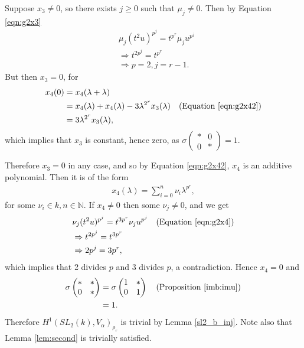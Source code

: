 	Suppose $x_3\neq 0$, so there exists $j\geq 0$ such that $\mu_j\neq 0$. Then by Equation \ref{eqn:g2x3}
	\begin{align*}
	&\mu_j (t^2u)^{p^j} = t^{p^r}\mu_j u^{p^j}\\
		&\Rightarrow t^{2p^j} = t^{p^r}\\
		&\Rightarrow p = 2, j = r-1.
		\end{align*}
		But then $x_3 = 0$, for
		\begin{align*}
		x_4(0) &= x_4(\lambda + \lambda) \\
							&= x_4(\lambda)+x_4(\lambda)-3\lambda^{2^r}x_3(\lambda)\quad(\textrm{Equation \ref{eqn:g2x42}}) \\
							&= 3\lambda^{2^r}x_3(\lambda),
		\end{align*}
		which implies that $x_3$ is constant, hence zero, as $\sigma\left(\begin{matrix}* & 0\\0 & *\end{matrix}\right) = 1$.

		Therefore $x_3 = 0$ in any case, and so by Equation \ref{eqn:g2x42}, $x_4$ is an additive polynomial. Then it is of the form
		\begin{align*}
		x_4(\lambda) = \sum_{i=0}^n \nu_i \lambda^{p^r},
		\end{align*}
		for some $\nu_i \in k, n\in\mathbb{N}$.
		If $x_4\neq 0$ then some $\nu_j\neq 0$, and we get
		\begin{align*}
		&\nu_j(t^2u)^{p^j} = t^{3p^r}\nu_j u^{p^j}\quad(\textrm{Equation \ref{eqn:g2x4}})\\
			&\Rightarrow t^{2p^j} = t^{3p^r}\\
			&\Rightarrow 2p^j = 3p^r,
		\end{align*}
		which implies that 2 divides $p$ and 3 divides $p$, a contradiction. Hence $x_4=0$ and
		\begin{align*}
		\sigma\left(\begin{matrix}* & *\\0 & *\end{matrix}\right) &= \sigma\left(\begin{matrix}1 & *\\0 & 1\end{matrix}\right) \quad(\textrm{Proposition \ref{imb:imu}}) \\
			&= 1.
			\end{align*}
			Therefore $H^1(SL_2(k), V_\alpha)_{\rho_r}$ is trivial by Lemma \ref{sl2_b_inj}. Note also that Lemma \ref{lem:second} is trivially satisfied.

